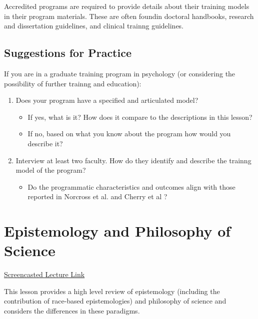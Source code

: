 \documentclass[
  english,
]{book}
\providecommand{\tightlist}{%
  \setlength{\itemsep}{0pt}\setlength{\parskip}{0pt}}
\begin{document}
Accredited programs are required to provide details about their training models in their program materials. These are often foundin doctoral handbooks, research and dissertation guidelines, and clinical trainng guidelines.

\hypertarget{suggestions-for-practice}{%
\section{Suggestions for Practice}\label{suggestions-for-practice}}

If you are in a graduate training program in psychology (or considering the possibility of further trainng and education):

\begin{enumerate}
\def\labelenumi{\arabic{enumi}.}
\tightlist
\item
  Does your program have a specified and articulated model?

  \begin{itemize}
  \tightlist
  \item
    If yes, what is it? How does it compare to the descriptions in this lesson?
  \item
    If no, based on what you know about the program how would you describe it?
  \end{itemize}
\item
  Interview at least two faculty. How do they identify and describe the trainng model of the program?

  \begin{itemize}
  \tightlist
  \item
    Do the programmatic characteristics and outcomes align with those reported in Norcross et al. \citeyearpar{norcross_doctoral_2020} and Cherry et al \citeyearpar{cherry_examination_2000}?
  \end{itemize}
\end{enumerate}

\hypertarget{PHoS}{%
\chapter{Epistemology and Philosophy of Science}\label{PHoS}}

\href{HTTPS://SPU.HOSTED.PANOPTO.COM/PANOPTO/PAGES/VIEWER.ASPX?PID=E521F3D0-BE61-4099-A108-AC40003B45E2}{Screencasted Lecture Link}

This lesson provides a high level review of epistemology (including the contribution of race-based epistemologies) and philosophy of science and considers the differences in these paradigms.
\end{document}
